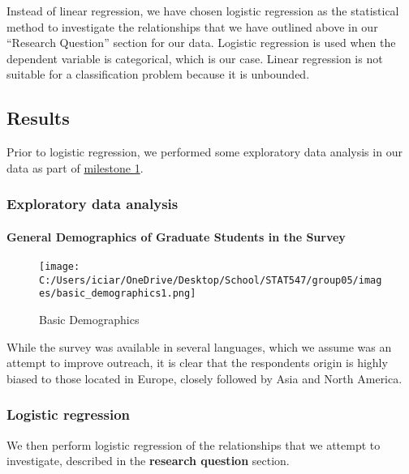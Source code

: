 \documentclass[
]{article}
\begin{document}
Instead of linear regression, we have chosen logistic regression as the
statistical method to investigate the relationships that we have
outlined above in our ``Research Question'' section for our data.
Logistic regression is used when the dependent variable is categorical,
which is our case. Linear regression is not suitable for a
classification problem because it is unbounded.

\hypertarget{results}{%
\subsection{Results}\label{results}}

Prior to logistic regression, we performed some exploratory data
analysis in our data as part of
\href{https://github.com/STAT547-UBC-2019-20/group05/tree/master/docs/milestone-01}{milestone
1}.

\hypertarget{exploratory-data-analysis}{%
\subsubsection{Exploratory data
analysis}\label{exploratory-data-analysis}}

\hypertarget{general-demographics-of-graduate-students-in-the-survey}{%
\paragraph{General Demographics of Graduate Students in the
Survey}\label{general-demographics-of-graduate-students-in-the-survey}}

\begin{figure}
\centering
\texttt{[image: C:/Users/iciar/OneDrive/Desktop/School/STAT547/group05/images/basic\_demographics1.png]}
\caption{Basic Demographics}
\end{figure}

While the survey was available in several languages, which we assume was
an attempt to improve outreach, it is clear that the respondents origin
is highly biased to those located in Europe, closely followed by Asia
and North America.

\hypertarget{logistic-regression}{%
\subsubsection{Logistic regression}\label{logistic-regression}}

We then perform logistic regression of the relationships that we attempt
to investigate, described in the \textbf{research question} section.
\end{document}
